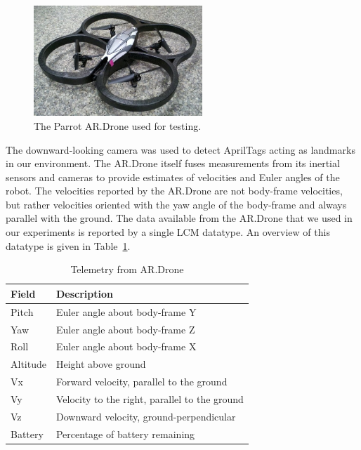 \documentclass[conference]{IEEEtran}
\begin{document}
\begin{figure}[!h]
  \centering
  \includegraphics[width=2.5in]{images/drone1}
  \caption{The Parrot AR.Drone used for testing.}
  \label{fig:drone}
\end{figure}

The downward-looking camera was used to detect AprilTags acting as landmarks in our
environment. The AR.Drone itself fuses measurements from its inertial sensors and cameras
to provide estimates of velocities and Euler angles of the robot. The velocities reported
by the AR.Drone are not body-frame velocities, but rather velocities oriented with the yaw
angle of the body-frame and always parallel with the ground. The data available from the
AR.Drone that we used in our experiments is reported by a single LCM datatype. An overview
of this datatype is given in Table~\ref{tab:telemetry}.

\begin{table}[!t]
\renewcommand{\arraystretch}{1.3}
\caption{Telemetry from AR.Drone}
\label{tab:telemetry}
\centering
\begin{tabular}{|l|l|}
\hline
Field & Description \\
\hline
Pitch & Euler angle about body-frame Y \\
Yaw & Euler angle about body-frame Z \\
Roll & Euler angle about body-frame X \\
Altitude & Height above ground \\
Vx & Forward velocity, parallel to the ground \\
Vy & Velocity to the right, parallel to the ground \\
Vz & Downward velocity, ground-perpendicular \\
Battery & Percentage of battery remaining \\
\hline
\end{tabular}
\end{table}
\end{document}
